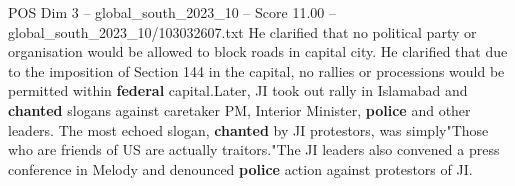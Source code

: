 \begin{textsample}{POS Dim 3 – global\_south\_2023\_10 – Score 11.00 – global\_south\_2023\_10/103032607.txt}
He clarified that no political party or organisation would be allowed to block roads in capital city.
He clarified that due to the imposition of Section 144 in the capital, no rallies or processions would be permitted within \textbf{federal} capital.Later, JI took out rally in Islamabad and \textbf{chanted} slogans against caretaker PM, Interior Minister, \textbf{police} and other leaders.
The most echoed slogan, \textbf{chanted} by JI protestors, was simply"Those who are friends of US are actually traitors."The JI leaders also convened a press conference in Melody and denounced \textbf{police} action against protestors of JI.

\end{textsample}
